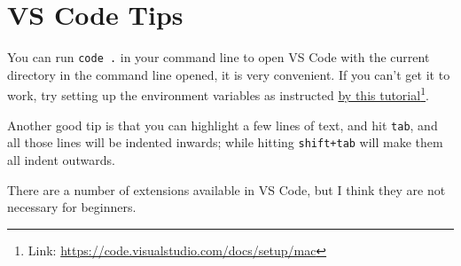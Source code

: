 \section{VS Code Tips}

You can run \texttt{code .} in your command line to open VS Code with the current directory in the command line opened, it is very convenient. If you can't get it to work, try setting up the environment variables as instructed \href{https://code.visualstudio.com/docs/setup/mac}{by this tutorial}\footnote{Link: \url{https://code.visualstudio.com/docs/setup/mac}}.
\vspace{6mm}

Another good tip is that you can highlight a few lines of text, and hit \texttt{tab}, and all those lines will be indented inwards; while hitting \texttt{shift+tab} will make them all indent outwards.
\vspace{6mm}

There are a number of extensions available in VS Code, but I think they are not necessary for beginners.